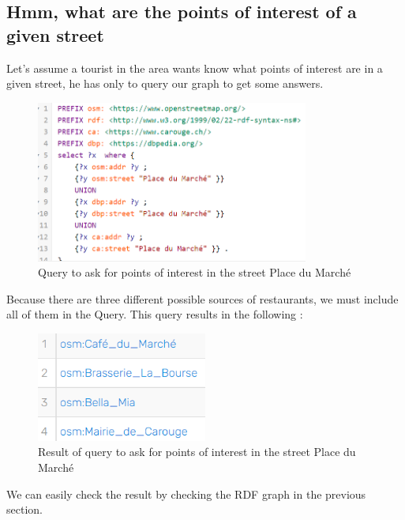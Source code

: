 \documentclass[a4paper]{article}
\begin{document}
\newpage
\subsection*{Hmm, what are the points of interest of a given street}
Let's assume a tourist in the area wants know what points of interest are in a given street, he has only to query our graph to get some answers.
\begin{figure}[H]
\center
\includegraphics*[width=0.8\textwidth]{images/place_rue_query.PNG}
\caption{Query to ask for points of interest in the street Place du Marché}
\end{figure}
Because there are three different possible sources of restaurants, we must include all of them in the Query. This query results in the following : 
\begin{figure}[H]
\center
\includegraphics*[width=0.5\textwidth]{images/place_rue_query_res.PNG}
\caption{Result of query to ask for points of interest in the street Place du Marché}
\end{figure}
We can easily check the result by checking the RDF graph in the previous section.
\end{document}
